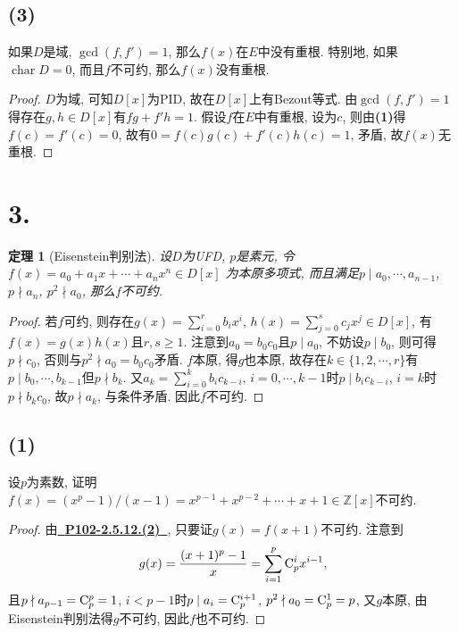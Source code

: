 \documentclass[12pt, a4paper, fontset=windows]{ctexart}
\newcommand{\Z}{\mathbb{Z}}
\newcommand{\ch}{\operatorname{char}}
\newcommand{\myref}[2][]{\hyperref[#1]{\bf\color{blue}\ {#2}\ }}
\newtheorem*{theorem}{定理}
\begin{document}
\subsection*{(3)}
\label{irr-no-dbl-rt}

如果$D$是域, $\gcd(f,f')=1$, 那么$f(x)$在$E$中没有重根. 
特别地, 如果$\ch D=0$, 而且$f$不可约, 那么$f(x)$没有重根. 

\begin{proof}
$D$为域, 可知$D[x]$为PID, 故在$D[x]$上有Bezout等式. 
由$\gcd(f,f')=1$得存在$g,h\in D[x]$有$fg+f'h=1$. 
假设$f$在$E$中有重根, 设为$c$, 则由{\bf (1)}得$f(c)=f'(c)=0$, 
故有$0=f(c)g(c)+f'(c)h(c)=1$, 矛盾, 故$f(x)$无重根. 
\end{proof}

\section*{3.}
\label{eisenstein}

\begin{theorem}[Eisenstein判别法]
设$D$为{\rm UFD}, $p$是素元, 令$f(x)=a_0+a_1x+\cdots+a_nx^n\in D[x]$
为本原多项式, 而且满足$p\mid a_0,\cdots,a_{n-1}$, $p\nmid a_n$, 
$p^2\nmid a_0$, 那么$f$不可约. 
\end{theorem}

\begin{proof}
若$f$可约, 则存在$g(x)=\sum^r_{i=0}b_ix^i$, $h(x)=\sum^s_{j=0}c_jx^j\in D[x]$, 
有$f(x)=g(x)h(x)$且$r,s\ge 1$. 注意到$a_0=b_0c_0$且$p\mid a_0$, 
不妨设$p\mid b_0$, 则可得$p\nmid c_0$, 否则与$p^2\nmid a_0=b_0c_0$矛盾. 
$f$本原, 得$g$也本原, 故存在$k\in\{1,2,\cdots,r\}$有
$p\mid b_0,\cdots,b_{k-1}$但$p\nmid b_k$. 又$a_k=\sum^k_{i=0}b_ic_{k-i}$, 
$i=0,\cdots,k-1$时$p\mid b_ic_{k-i}$, $i=k$时$p\nmid b_kc_0$, 
故$p\nmid a_k$, 与条件矛盾. 因此$f$不可约. 
\end{proof}

\subsection*{(1)}
\label{irr-prime-cyclotomic}

设$p$为素数, 证明$f(x)=(x^p-1)/(x-1)=x^{p-1}+x^{p-2}+\cdots+x+1\in\Z[x]$不可约. 

\begin{proof}
由\myref[irr-translation]{P102-2.5.12.(2)}, 只要证$g(x)=f(x+1)$不可约. 注意到
\[g(x)=\frac{(x+1)^p-1}{x}=\sum^p_{i=1}{\rm C}^i_px^{i-1},\]
且$p\nmid a_{p-1}={\rm C}^p_p=1$, $i<p-1$时$p\mid a_i={\rm C}^{i+1}_p$, 
$p^2\nmid a_0={\rm C}^1_p=p$, 又$g$本原, 由Eisenstein判别法得$g$不可约, 因此$f$也不可约. 
\end{proof}
\end{document}
